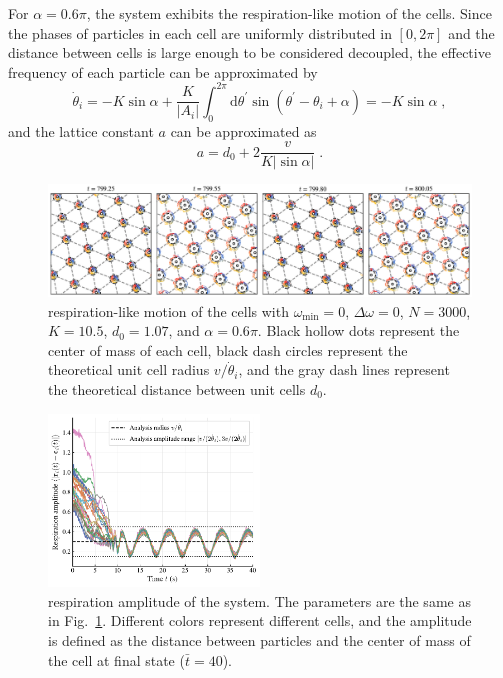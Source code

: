 \documentclass{article}
\begin{document}
For $\alpha=0.6\pi$, the system exhibits the respiration-like motion of the cells. Since the phases of particles in each cell are uniformly distributed in $[0, 2\pi]$ and the distance between cells is large enough to be considered decoupled, the effective frequency of each particle can be approximated by
\begin{equation}
    \dot{\theta}_i=-K\sin \alpha +\frac{K}{\left| A_i \right|}\int_0^{2\pi}{\mathrm{d}\theta ^{\prime}\sin \left( \theta ^{\prime}-\theta _i+\alpha \right)}=-K\sin \alpha\;,
\end{equation}
and the lattice constant $a$ can be approximated as 
\begin{equation}
    a=d_0+2\frac{v}{K\left| \sin \alpha \right|}\;.
    \label{eq:latticeConstant}
\end{equation}
\begin{figure}[H]
    \centering
    \includegraphics[width=\textwidth]{./figs/respiration_snapshot.pdf}
    \caption{
        \label{fig:respiration_snapshot}
        respiration-like motion of the cells with $\omega _{\min}=0$, $\Delta \omega=0$, $N=3000$, $K=10.5$, $d_0=1.07$, and $\alpha=0.6\pi$. Black hollow dots represent the center of mass of each cell, black dash circles represent the theoretical unit cell radius $v/\dot{\theta}_i$, and the gray dash lines represent the theoretical distance between unit cells $d_0$.
    }
\end{figure}
\begin{figure}[H]
    \centering
    \includegraphics[width=0.5\textwidth]{./figs/respiration_amplitude.pdf}
    \caption{
        \label{fig:respiration_amplitude}
        respiration amplitude of the system. 
        The parameters are the same as in Fig.~\ref{fig:respiration_snapshot}.
        Different colors represent different cells, and the amplitude is defined as the distance between particles and the center of mass of the cell at final state ($\bar{t}=40$).
    }
\end{figure}
\end{document}
